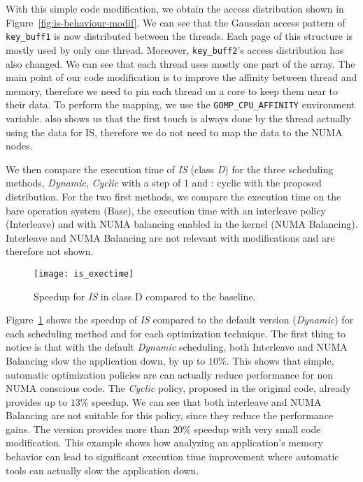 With this simple code modification, we obtain the access distribution
shown in Figure~\ref{fig:is-behaviour-modif}. We can see that the Gaussian
access pattern of \texttt{key\_buff1} is now distributed between the threads. Each page
of this structure is mostly used by only one thread. Moreover,
\texttt{key\_buff2}'s access distribution has also changed. We can see that
each thread uses mostly one part of the array.
The main point of our code modification is to improve the affinity between
thread and memory, therefore we need to pin each thread on a core to keep them
near to their data. To perform the mapping, we use the \texttt{GOMP\_CPU\_AFFINITY} environment variable. \TABARNAC
also shows us that the first touch is always done by the thread actually using
the data for IS, therefore we do not need to map the data to the NUMA nodes.

We then compare the execution time of \emph{IS} (class \emph{D}) for the three scheduling
methods, \emph{Dynamic}, \emph{Cyclic} with a step of $1$ and \TABARNAC:
cyclic with the proposed distribution. For the two first methods, we compare the
execution time on the bare operation system (Base), the execution time with an
interleave policy (Interleave) and with NUMA balancing enabled in the kernel
(NUMA Balancing). Interleave and NUMA Balancing are not relevant with
\TABARNAC modifications and are therefore not shown.

\begin{figure}[!p]
    \centering
    \texttt{[image: is\_exectime]}
    \vspace{-5mm}
    \caption{Speedup for \emph{IS} in class D compared to the baseline.}
\label{fig:is-res}
\end{figure}

Figure~\ref{fig:is-res} shows the speedup of \emph{IS} compared to
the default version (\emph{Dynamic}) for each scheduling method and for each
optimization technique. The first thing to notice is that with the default
\emph{Dynamic} scheduling, both Interleave and NUMA Balancing slow
the application down, by up to $10\%$. This shows that simple, automatic optimization policies are can actually reduce performance
for non NUMA conscious code.
The \emph{Cyclic} policy, proposed in the original code, already provides up to $13\%$
speedup. We can see that both interleave and NUMA Balancing are not suitable
for this policy, since they reduce the performance gains.
The \TABARNAC version provides more than $20\%$ speedup with very small code
modification.
This example shows how analyzing an application's memory behavior can lead to
significant execution time improvement where automatic tools can actually slow
the application down.

